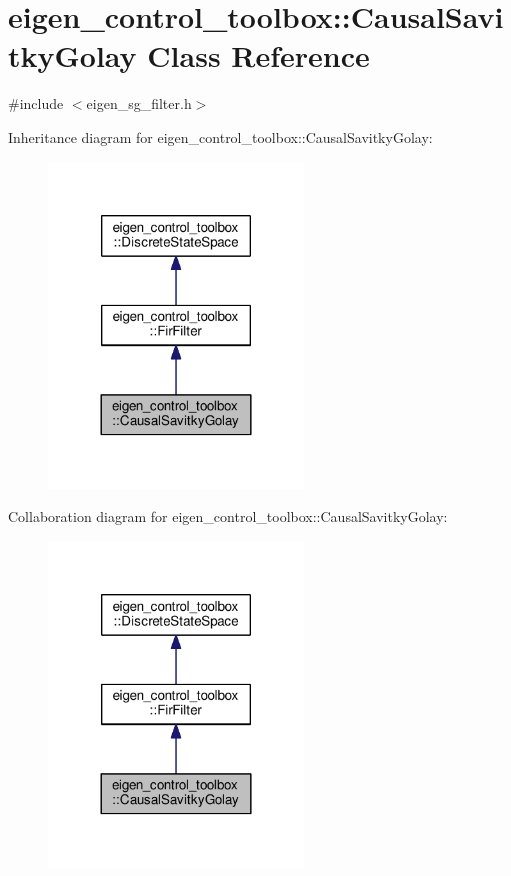 \hypertarget{classeigen__control__toolbox_1_1_causal_savitky_golay}{}\section{eigen\+\_\+control\+\_\+toolbox\+:\+:Causal\+Savitky\+Golay Class Reference}
\label{classeigen__control__toolbox_1_1_causal_savitky_golay}


{\ttfamily \#include $<$eigen\+\_\+sg\+\_\+filter.\+h$>$}



Inheritance diagram for eigen\+\_\+control\+\_\+toolbox\+:\+:Causal\+Savitky\+Golay\+:
\nopagebreak
\begin{figure}[H]
\begin{center}
\leavevmode
\includegraphics[width=192pt]{classeigen__control__toolbox_1_1_causal_savitky_golay__inherit__graph}
\end{center}
\end{figure}


Collaboration diagram for eigen\+\_\+control\+\_\+toolbox\+:\+:Causal\+Savitky\+Golay\+:
\nopagebreak
\begin{figure}[H]
\begin{center}
\leavevmode
\includegraphics[width=192pt]{classeigen__control__toolbox_1_1_causal_savitky_golay__coll__graph}
\end{center}
\end{figure}
